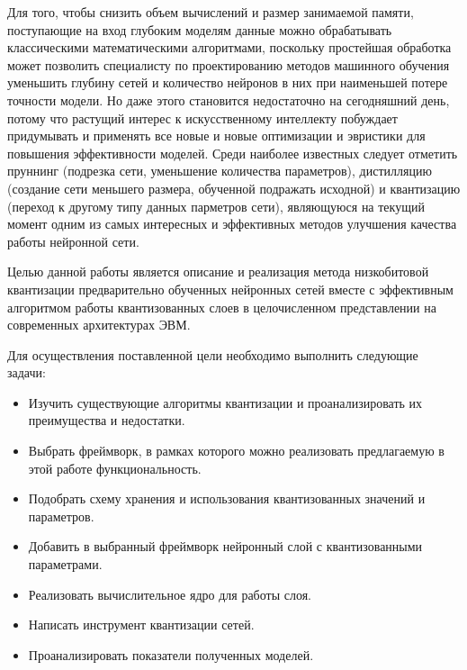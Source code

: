 Для того, чтобы снизить объем вычислений и размер занимаемой памяти, поступающие на вход глубоким моделям данные можно обрабатывать классическими математическими алгоритмами, поскольку простейшая обработка может позволить специалисту по проектированию методов машинного обучения уменьшить глубину сетей и количество нейронов в них при наименьшей потере точности модели. 
Но даже этого становится недостаточно на сегодняшний день, потому что растущий интерес к искусственному интеллекту побуждает придумывать и применять все новые и новые оптимизации и эвристики для повышения эффективности моделей. Среди наиболее известных следует отметить пруннинг (подрезка сети, уменьшение количества параметров), дистилляцию (создание сети меньшего размера, обученной подражать исходной) и квантизацию (переход к другому типу данных парметров сети), являющуюся на текущий момент одним из самых интересных и эффективных методов улучшения качества работы нейронной сети. 

Целью данной работы является описание и реализация метода низкобитовой квантизации предварительно обученных нейронных сетей вместе с эффективным алгоритмом работы квантизованных слоев в целочисленном представлении на современных архитектурах ЭВМ.

Для осуществления поставленной цели необходимо выполнить следующие задачи:
\begin{itemize}
    \item Изучить существующие алгоритмы квантизации и проанализировать их преимущества и недостатки.
    \item Выбрать фреймворк, в рамках которого можно реализовать предлагаемую в этой работе функциональность.
    \item Подобрать схему хранения и использования квантизованных значений и параметров.
    \item Добавить в выбранный фреймворк нейронный слой с квантизованными параметрами.
    \item Реализовать вычислительное ядро для работы слоя.
    \item Написать инструмент квантизации сетей.
    \item Проанализировать показатели полученных моделей.
\end{itemize}
